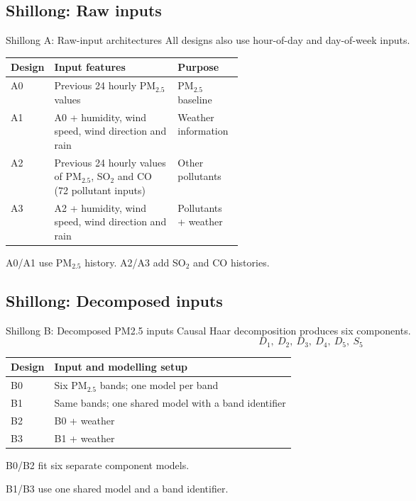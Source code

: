 \subsection{Shillong: Raw inputs}
\begin{frame}{Shillong A: Raw-input architectures}
  {\small All designs also use hour-of-day and day-of-week inputs.}\par\medskip
  \scriptsize
  \begin{tabularx}{\linewidth}{@{}p{0.10\linewidth}Xp{0.28\linewidth}@{}}
    \toprule
    Design & Input features & Purpose \\
    \midrule
    A0 & Previous 24 hourly PM$_{2.5}$ values & PM$_{2.5}$ baseline \\[0.7em]
    A1 & A0 + humidity, wind speed, wind direction and rain & Weather information \\[0.7em]
    A2 & Previous 24 hourly values of PM$_{2.5}$, SO$_2$ and CO (72 pollutant inputs) & Other pollutants \\[0.7em]
    A3 & A2 + humidity, wind speed, wind direction and rain & Pollutants + weather \\
    \bottomrule
  \end{tabularx}
  \par\medskip
  A0/A1 use PM$_{2.5}$ history. A2/A3 add SO$_2$ and CO histories.
\end{frame}

\subsection{Shillong: Decomposed inputs}
\begin{frame}{Shillong B: Decomposed PM2.5 inputs}
  {\small Causal Haar decomposition produces six components.}
  \[
    D_1,\ D_2,\ D_3,\ D_4,\ D_5,\ S_5
  \]
  \small
  \begin{tabularx}{\linewidth}{@{}lX@{}}
    \toprule
    Design & Input and modelling setup \\
    \midrule
    B0 & Six PM$_{2.5}$ bands; one model per band \\[0.5em]
    B1 & Same bands; one shared model with a band identifier \\[0.5em]
    B2 & B0 + weather \\[0.5em]
    B3 & B1 + weather \\
    \bottomrule
  \end{tabularx}
  \par\medskip
  B0/B2 fit six separate component models.\par
  B1/B3 use one shared model and a band identifier.
\end{frame}

